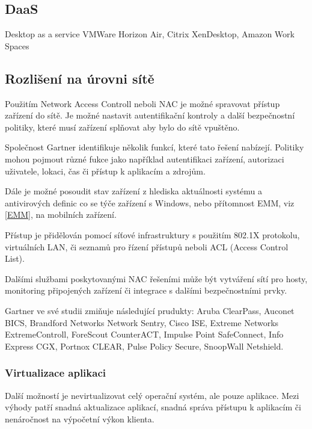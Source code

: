  
 \subsection{DaaS}
 Desktop as a service
 VMWare Horizon Air, Citrix XenDesktop, Amazon Work Spaces
 
 
 \subsection{Rozlišení na úrovni sítě}
 Použitím Network Access Controll neboli NAC je možné spravovat přístup zařízení do sítě. Je možné nastavit autentifikační kontroly a další bezpečnostní politiky, které musí zařízení splňovat aby bylo do sítě vpuštěno. 
 
 Společnost Gartner identifikuje několik funkcí, které tato řešení nabízejí. 
 Politiky mohou pojmout různé fukce jako například autentifikaci zařízení, autorizaci uživatele, lokaci, čas či přístup k aplikacím a zdrojům.
 
 Dále je možné posoudit stav zařízení z hlediska aktuálnosti systému a antivirových definic co se týče zařízení s Windows, nebo přítomnost EMM, viz \ref{EMM},  na mobilních zařízení.
 
 Přístup je přidělován pomocí síťové infrastruktury s použitím 802.1X protokolu, virtuálních LAN, či seznamů pro řízení přístupů neboli ACL (Access Control List).
 
 Dalšími službami poskytovanými NAC řešeními může být vytváření sítí pro hosty, monitoring připojených zařízení či integrace s dalšími bezpečnostními prvky.
 
 
Gartner ve své studii zmiňuje následující prudukty: Aruba ClearPass, Auconet BICS, Brandford Networks Network Sentry, Cisco ISE, Extreme Networks ExtremeControll, ForeScout CounterACT, Impulse Point SafeConnect, Info Express CGX, Portnox CLEAR, Pulse Policy Secure, SnoopWall Netshield.
 
 
 \subsubsection{Virtualizace aplikaci}
 Další možností je nevirtualizovat celý operační systém, ale pouze aplikace. Mezi výhody patří snadná aktualizace aplikací, snadná správa přístupu k aplikacím či nenáročnost na výpočetní výkon klienta.
 
